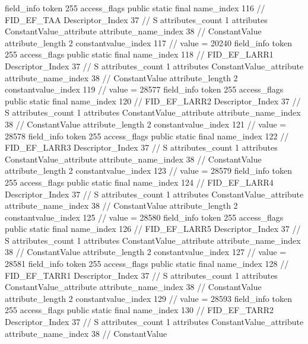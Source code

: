 {{{{{{{				}
				}
			}
			field_info {
				token	255
				access_flags	public static final
				name_index	116		// FID_EF_TAA
				Descriptor_Index	37		// S
				attributes_count	1
				attributes {
				ConstantValue_attribute {
					attribute_name_index	38		// ConstantValue
					attribute_length	2
					constantvalue_index	117		// value = 20240
				}
				}
			}
			field_info {
				token	255
				access_flags	public static final
				name_index	118		// FID_EF_LARR1
				Descriptor_Index	37		// S
				attributes_count	1
				attributes {
				ConstantValue_attribute {
					attribute_name_index	38		// ConstantValue
					attribute_length	2
					constantvalue_index	119		// value = 28577
				}
				}
			}
			field_info {
				token	255
				access_flags	public static final
				name_index	120		// FID_EF_LARR2
				Descriptor_Index	37		// S
				attributes_count	1
				attributes {
				ConstantValue_attribute {
					attribute_name_index	38		// ConstantValue
					attribute_length	2
					constantvalue_index	121		// value = 28578
				}
				}
			}
			field_info {
				token	255
				access_flags	public static final
				name_index	122		// FID_EF_LARR3
				Descriptor_Index	37		// S
				attributes_count	1
				attributes {
				ConstantValue_attribute {
					attribute_name_index	38		// ConstantValue
					attribute_length	2
					constantvalue_index	123		// value = 28579
				}
				}
			}
			field_info {
				token	255
				access_flags	public static final
				name_index	124		// FID_EF_LARR4
				Descriptor_Index	37		// S
				attributes_count	1
				attributes {
				ConstantValue_attribute {
					attribute_name_index	38		// ConstantValue
					attribute_length	2
					constantvalue_index	125		// value = 28580
				}
				}
			}
			field_info {
				token	255
				access_flags	public static final
				name_index	126		// FID_EF_LARR5
				Descriptor_Index	37		// S
				attributes_count	1
				attributes {
				ConstantValue_attribute {
					attribute_name_index	38		// ConstantValue
					attribute_length	2
					constantvalue_index	127		// value = 28581
				}
				}
			}
			field_info {
				token	255
				access_flags	public static final
				name_index	128		// FID_EF_TARR1
				Descriptor_Index	37		// S
				attributes_count	1
				attributes {
				ConstantValue_attribute {
					attribute_name_index	38		// ConstantValue
					attribute_length	2
					constantvalue_index	129		// value = 28593
				}
				}
			}
			field_info {
				token	255
				access_flags	public static final
				name_index	130		// FID_EF_TARR2
				Descriptor_Index	37		// S
				attributes_count	1
				attributes {
				ConstantValue_attribute {
					attribute_name_index	38		// ConstantValue
}}}}}}}
